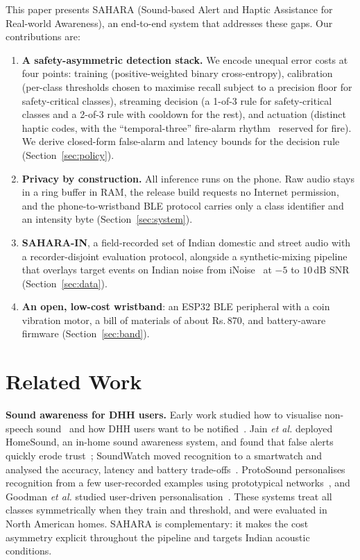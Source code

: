 \documentclass[conference]{IEEEtran}
\newcommand{\INR}{Rs.\,}
\begin{document}
This paper presents SAHARA (Sound-based Alert and Haptic Assistance for Real-world Awareness), an end-to-end system that addresses these gaps. Our contributions are:
\begin{enumerate}
\item \textbf{A safety-asymmetric detection stack.} We encode unequal error costs at four points: training (positive-weighted binary cross-entropy), calibration (per-class thresholds chosen to maximise recall subject to a precision floor for safety-critical classes), streaming decision (a 1-of-3 rule for safety-critical classes and a 2-of-3 rule with cooldown for the rest), and actuation (distinct haptic codes, with the ``temporal-three'' fire-alarm rhythm~\cite{iso8201} reserved for fire). We derive closed-form false-alarm and latency bounds for the decision rule (Section~\ref{sec:policy}).
\item \textbf{Privacy by construction.} All inference runs on the phone. Raw audio stays in a ring buffer in RAM, the release build requests no Internet permission, and the phone-to-wristband BLE protocol carries only a class identifier and an intensity byte (Section~\ref{sec:system}).
\item \textbf{SAHARA-IN}, a field-recorded set of Indian domestic and street audio with a recorder-disjoint evaluation protocol, alongside a synthetic-mixing pipeline that overlays target events on Indian noise from iNoise~\cite{inoise} at $-5$ to $10$\,dB SNR (Section~\ref{sec:data}).
\item \textbf{An open, low-cost wristband}: an ESP32 BLE peripheral with a coin vibration motor, a bill of materials of about \INR870, and battery-aware firmware (Section~\ref{sec:band}).
\end{enumerate}

\section{Related Work}
\textbf{Sound awareness for DHH users.} Early work studied how to visualise non-speech sound~\cite{matthews2006} and how DHH users want to be notified~\cite{bragg2016,findlater2019}. Jain \emph{et al.} deployed HomeSound, an in-home sound awareness system, and found that false alerts quickly erode trust~\cite{jain2020homesound}; SoundWatch moved recognition to a smartwatch and analysed the accuracy, latency and battery trade-offs~\cite{jain2020soundwatch}. ProtoSound personalises recognition from a few user-recorded examples using prototypical networks~\cite{jain2022protosound,snell2017}, and Goodman \emph{et al.} studied user-driven personalisation~\cite{goodman2021}. These systems treat all classes symmetrically when they train and threshold, and were evaluated in North American homes. SAHARA is complementary: it makes the cost asymmetry explicit throughout the pipeline and targets Indian acoustic conditions.
\end{document}
